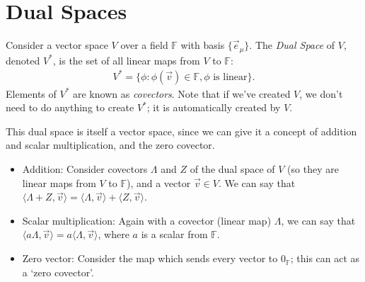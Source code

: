 \chapter{Dual Spaces}
Consider a vector space $V$ over a field $\mathbb{F}$ with basis $\{\vec{e}_\mu\}$.
The \emph{Dual Space} of $V$, denoted $V^*$, is the set of all linear maps from $V$ to $\mathbb{F}$:
\begin{align*}
    V^* = \{\phi : \phi(\vec{v}) \in \mathbb{F}, \phi \text{ is linear}\}.
\end{align*}
Elements of $V^*$ are known as \emph{covectors}. Note that if we've created $V$, we don't need to do anything to create $V^*$; it is automatically created by $V$.

This dual space is itself a vector space, since we can give it a concept of addition and scalar multiplication, and the zero covector.
\begin{itemize}
    \item Addition: Consider covectors $\Lambda$ and $Z$ of the dual space of $V$ (so they are linear maps from $V$ to $\mathbb{F}$), and a vector $\vec{v} \in V$. We can say that $\langle \Lambda + Z, \vec{v} \rangle = \langle \Lambda,\vec{v} \rangle + \langle Z, \vec{v} \rangle$.
    \item Scalar multiplication: Again with a covector (linear map) $\Lambda$, we can say that $\langle a\Lambda, \vec{v} \rangle = a\langle \Lambda, \vec{v} \rangle$, where $a$ is a scalar from $\mathbb{F}$.
    \item Zero vector: Consider the map which sends every vector to $0_\mathbb{F}$; this can act as a `zero covector'.
\end{itemize}

